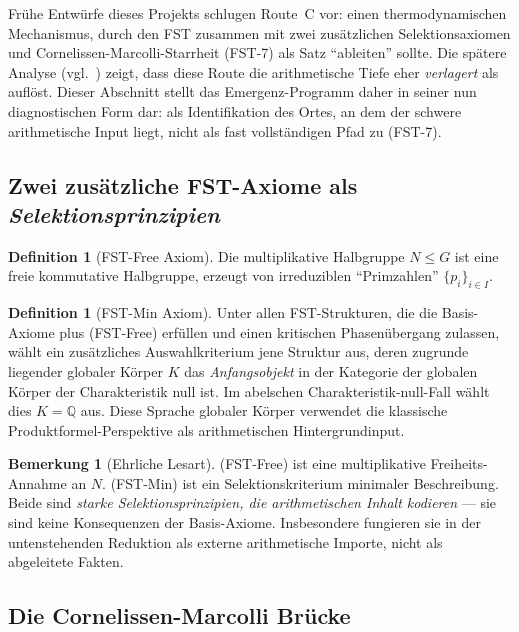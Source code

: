 \documentclass[11pt,a4paper]{article}
\theoremstyle{plain}
\theoremstyle{definition}
\newtheorem{definition}[theorem]{Definition}
\newtheorem{remark}[theorem]{Bemerkung}
\newcommand{\Q}{\mathbb{Q}}
\begin{document}
Frühe Entwürfe dieses Projekts schlugen Route~C vor: einen thermodynamischen
Mechanismus, durch den FST zusammen mit zwei zusätzlichen Selektionsaxiomen
und Cornelissen-Marcolli-Starrheit (FST-7) als Satz ``ableiten'' sollte.
Die spätere Analyse (vgl.~\cite{L1KAttack,EmergenceAttack}) zeigt, dass
diese Route die arithmetische Tiefe eher \emph{verlagert} als auflöst.
Dieser Abschnitt stellt das Emergenz-Programm daher in seiner nun
diagnostischen Form dar: als Identifikation des Ortes, an dem der schwere
arithmetische Input liegt, nicht als fast vollständigen Pfad zu (FST-7).

\subsection{Zwei zusätzliche FST-Axiome als \emph{Selektionsprinzipien}}
\label{sec:extra-axioms}

\begin{definition}[FST-Free Axiom]\label{def:fst-free}
Die multiplikative Halbgruppe $N \le G$ ist eine freie kommutative
Halbgruppe, erzeugt von irreduziblen ``Primzahlen'' $\{p_i\}_{i \in I}$.
\end{definition}

\begin{definition}[FST-Min Axiom]\label{def:fst-min}
Unter allen FST-Strukturen, die die Basis-Axiome plus
(FST-Free) erfüllen und einen kritischen Phasenübergang zulassen,
wählt ein zusätzliches Auswahlkriterium jene Struktur aus, deren zugrunde liegender
globaler Körper $K$ das \emph{Anfangsobjekt} in der Kategorie der globalen
Körper der Charakteristik null ist. Im abelschen Charakteristik-null-Fall
wählt dies $K = \Q$ aus. Diese Sprache globaler Körper verwendet die
klassische Produktformel-Perspektive \cite{ArtinWhaples1945} als
arithmetischen Hintergrundinput.
\end{definition}

\begin{remark}[Ehrliche Lesart]
\label{rem:fst-free-min-imports}
(FST-Free) ist eine multiplikative Freiheits-Annahme an $N$. (FST-Min)
ist ein Selektionskriterium minimaler Beschreibung. Beide sind \emph{starke
Selektionsprinzipien, die arithmetischen Inhalt kodieren} --- sie sind
keine Konsequenzen der Basis-Axiome. Insbesondere fungieren sie in der
untenstehenden Reduktion als externe arithmetische Importe, nicht
als abgeleitete Fakten.
\end{remark}

\subsection{Die Cornelissen-Marcolli Brücke}
\label{sec:cm-bridge}
\end{document}
